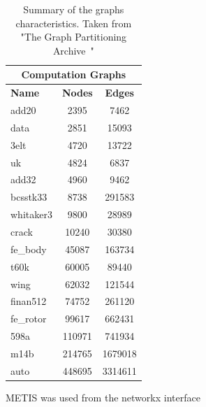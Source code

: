 \begin{table}
\centering
\begin{tabular}{ |p{1.75cm}||cc|  }
\hline
\multicolumn{3}{|c|}{\textbf{Computation Graphs}} \\
\hline
\hline
\textbf{Name} & \textbf{Nodes} & \textbf{Edges} \\
\hline
add20 & 2395 & 7462  \\
data & 2851 & 15093  \\
3elt & 4720 & 13722  \\
uk & 4824 & 6837  \\
add32 & 4960 & 9462  \\
bcsstk33 & 8738 & 291583  \\
whitaker3 & 9800 & 28989  \\
crack & 10240 & 30380  \\
\hline
fe\_body & 45087 & 163734  \\
t60k & 60005 & 89440  \\
wing & 62032 & 121544  \\
finan512 & 74752 & 261120 \\
\hline
fe\_rotor & 99617 & 662431  \\
598a & 110971 & 741934  \\
m14b & 214765 & 1679018	 \\
auto & 448695 & 3314611  \\
\hline
\end{tabular}
\caption{\label{tab:comp_graphs}Summary of the graphs characteristics. Taken from "The Graph Partitioning Archive~\citep{archive}"}
\end{table}

METIS was used from the networkx interface